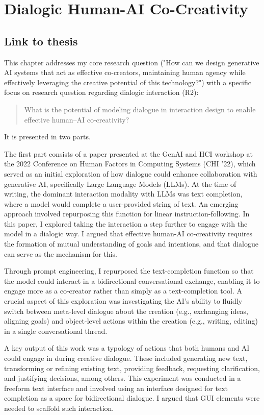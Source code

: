 \chapter{Dialogic Human-AI Co-Creativity} \label{c:tc4}

\section{Link to thesis}
This chapter addresses my core research question ("How can we design generative AI systems that act as effective co-creators, maintaining human agency while effectively leveraging the creative potential of this technology?") with a specific focus on research question regarding dialogic interaction (R2):
\begin{quote}
What is the potential of modeling dialogue in interaction design to enable effective human–AI co-creativity?
\end{quote}
It is presented in two parts.

The first part consists of a paper presented at the GenAI and HCI workshop at the 2022 Conference on Human Factors in Computing Systems (CHI '22), which served as an initial exploration of how dialogue could enhance collaboration with generative AI, specifically Large Language Models (LLMs). At the time of writing, the dominant interaction modality with LLMs was text completion, where a model would complete a user-provided string of text. An emerging approach involved repurposing this function for linear instruction-following. In this paper, I explored taking the interaction a step further to engage with the model in a dialogic way. I argued that effective human-AI co-creativity requires the formation of mutual understanding of goals and intentions, and that dialogue can serve as the mechanism for this.

Through prompt engineering, I repurposed the text-completion function so that the model could interact in a bidirectional conversational exchange, enabling it to engage more as a co-creator rather than simply as a text-completion tool. A crucial aspect of this exploration was investigating the AI's ability to fluidly switch between meta-level dialogue about the creation (e.g., exchanging ideas, aligning goals) and object-level actions within the creation (e.g., writing, editing) in a single conversational thread.

A key output of this work was a typology of actions that both humans and AI could engage in during creative dialogue. These included generating new text, transforming or refining existing text, providing feedback, requesting clarification, and justifying decisions, among others.
This experiment was conducted in a freeform text interface and involved using an interface designed for text completion as a space for bidirectional dialogue. I argued that GUI elements were needed to scaffold such interaction.

